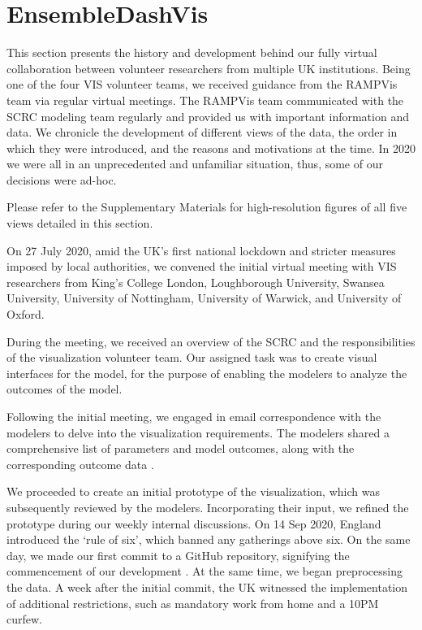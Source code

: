 \section{EnsembleDashVis}
\label{sec:EnsembleDashVis}

This section presents the history and development behind our fully virtual collaboration between volunteer researchers from multiple UK institutions.
Being one of the four VIS volunteer teams, we received guidance from the RAMPVis team via regular virtual meetings. The RAMPVis team communicated with the SCRC modeling team regularly and provided us with important information and data.
We chronicle the development of different views of the data, the order in which they were introduced, and the reasons and motivations at the time.
In 2020 we were all in an unprecedented and unfamiliar situation, thus, some of our decisions were ad-hoc.

Please refer to the Supplementary Materials for high-resolution figures of all five views detailed in this section.


\label{subsec:InitialMeeting}
On 27 July 2020, amid the UK's first national lockdown and stricter measures imposed by local authorities, we convened the initial virtual meeting with VIS researchers from King's College London, Loughborough University, Swansea University, University of Nottingham, University of Warwick, and University of Oxford.

During the meeting, we received an overview of the SCRC and the responsibilities of the visualization volunteer team.
Our assigned task was to create visual interfaces for the model, for the purpose of enabling the modelers to analyze the outcomes of the model.

Following the initial meeting, we engaged in email correspondence with the modelers to delve into the visualization requirements. The modelers shared a comprehensive list of parameters and model outcomes, along with the corresponding outcome data \cite{2020Covid19}.


We proceeded to create an initial prototype of the visualization, which was subsequently reviewed by the modelers.
Incorporating their input, we refined the prototype during our weekly internal discussions.
On 14 Sep 2020, England introduced the `rule of six', which banned any gatherings above six.
On the same day, we made our first commit to a GitHub repository, signifying the commencement of our development \cite{wang2020EnsembleVis}.
At the same time, we began preprocessing the data.
A week after the initial commit, the UK witnessed the implementation of additional restrictions, such as mandatory work from home and a 10PM curfew.

